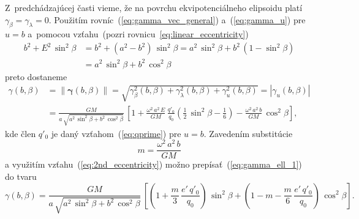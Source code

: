 \documentclass[a4paper, 12pt]{book}
\begin{document}
Z~predchádzajúcej časti vieme, že na povrchu ekvipotenciálneho elipsoidu platí 
$\gamma_\beta = \gamma_\lambda = 0$.  Použitím 
rovníc~(\ref{eq:gamma_vec_general}) a~(\ref{eq:gamma_u}) pre $u = b$ a~pomocou 
vzťahu~(pozri rovnicu~\ref{eq:linear_eccentricity})
%
\begin{equation}
\begin{split}
b^2 + E^2 \, \sin^2\beta &= b^2 + (a^2 - b^2) \, \sin^2\beta = a^2 \, 
\sin^2\beta + b^2 \, (1 - \sin^2\beta)\\
%
&= a^2 \, \sin^2\beta + b^2 \, \cos^2\beta
\end{split}
\end{equation}
%
preto dostaneme
%
\begin{equation}
\label{eq:gamma_ell_1}
\begin{split}
\gamma(b, \beta) &= \| \boldsymbol \gamma(b, \beta) \| 
= \sqrt{\gamma^2_\beta(b, \beta) + \gamma^2_\lambda(b, \beta) + \gamma^2_u(b, 
\beta)} = | \gamma_u(b, \beta) |\\
%
&= \frac{GM}{a \, \sqrt{a^2 \, \sin^2\beta + b^2 \, \cos^2\beta}} \, \left[ 
1 + \frac{\omega^2 \, a^2 \, E}{GM} \, \frac{q'_0}{q_0} \left( \frac{1}{2} \, 
\sin^2\beta - \frac{1}{6} \right) - \frac{\omega^2 \, a^2 \, b}{GM} \, 
\cos^2\beta \right]
{,}
\end{split}
\end{equation}
%
kde člen $q'_0$ je daný vzťahom~(\ref{eq:qprime}) pre $u = b$.  Zavedením 
substitúcie
%
\begin{equation}
m = \frac{\omega^2 \, a^2 \, b}{GM}
\end{equation}
%
a využitím vzťahu~(\ref{eq:2nd_eccentricity}) možno 
prepísať~(\ref{eq:gamma_ell_1}) do tvaru
%
\begin{equation}
\label{eq:gamma_ell_2}
\gamma(b, \beta) = \frac{GM}{a \, \sqrt{a^2 \, \sin^2\beta + b^2 \, 
\cos^2\beta}} \, \left[ \left( 1 + \frac{m}{3} \, \frac{e' \, q'_0}{q_0} 
\right) \, \sin^2\beta + \left( 1 - m - \frac{m}{6} \, \frac{e' \, q'_0}{q_0} 
\right) \, \cos^2\beta
\right]{.}
\end{equation}
\end{document}
